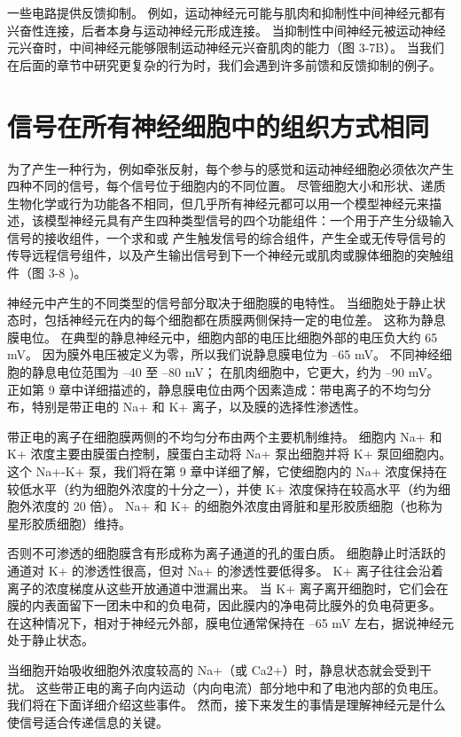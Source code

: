 一些电路提供反馈抑制。 例如，运动神经元可能与肌肉和抑制性中间神经元都有兴奋性连接，后者本身与运动神经元形成连接。 当抑制性中间神经元被运动神经元兴奋时，中间神经元能够限制运动神经元兴奋肌肉的能力（图 3-7B）。 当我们在后面的章节中研究更复杂的行为时，我们会遇到许多前馈和反馈抑制的例子。

\section{信号在所有神经细胞中的组织方式相同}
为了产生一种行为，例如牵张反射，每个参与的感觉和运动神经细胞必须依次产生四种不同的信号，每个信号位于细胞内的不同位置。 尽管细胞大小和形状、递质生物化学或行为功能各不相同，但几乎所有神经元都可以用一个模型神经元来描述，该模型神经元具有产生四种类型信号的四个功能组件：一个用于产生分级输入信号的接收组件，一个求和或 产生触发信号的综合组件，产生全或无传导信号的传导远程信号组件，以及产生输出信号到下一个神经元或肌肉或腺体细胞的突触组件（图 3-8 )。

神经元中产生的不同类型的信号部分取决于细胞膜的电特性。 当细胞处于静止状态时，包括神经元在内的每个细胞都在质膜两侧保持一定的电位差。 这称为静息膜电位。 在典型的静息神经元中，细胞内部的电压比细胞外部的电压负大约 65 mV。 因为膜外电压被定义为零，所以我们说静息膜电位为 –65 mV。 不同神经细胞的静息电位范围为 –40 至 –80 mV； 在肌肉细胞中，它更大，约为 –90 mV。 正如第 9 章中详细描述的，静息膜电位由两个因素造成：带电离子的不均匀分布，特别是带正电的 Na+ 和 K+ 离子，以及膜的选择性渗透性。

带正电的离子在细胞膜两侧的不均匀分布由两个主要机制维持。 细胞内 Na+ 和 K+ 浓度主要由膜蛋白控制，膜蛋白主动将 Na+ 泵出细胞并将 K+ 泵回细胞内。 这个 Na+-K+ 泵，我们将在第 9 章中详细了解，它使细胞内的 Na+ 浓度保持在较低水平（约为细胞外浓度的十分之一），并使 K+ 浓度保持在较高水平（约为细胞外浓度的 20 倍）。 Na+ 和 K+ 的细胞外浓度由肾脏和星形胶质细胞（也称为星形胶质细胞）维持。

否则不可渗透的细胞膜含有形成称为离子通道的孔的蛋白质。 细胞静止时活跃的通道对 K+ 的渗透性很高，但对 Na+ 的渗透性要低得多。 K+ 离子往往会沿着离子的浓度梯度从这些开放通道中泄漏出来。 当 K+ 离子离开细胞时，它们会在膜的内表面留下一团未中和的负电荷，因此膜内的净电荷比膜外的负电荷更多。 在这种情况下，相对于神经元外部，膜电位通常保持在 –65 mV 左右，据说神经元处于静止状态。

当细胞开始吸收细胞外浓度较高的 Na+（或 Ca2+）时，静息状态就会受到干扰。 这些带正电的离子向内运动（内向电流）部分地中和了电池内部的负电压。 我们将在下面详细介绍这些事件。 然而，接下来发生的事情是理解神经元是什么使信号适合传递信息的关键。

